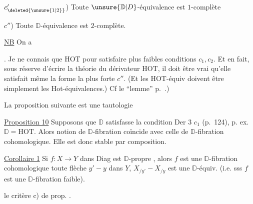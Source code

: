 $c_{\deleted{\unsure{1|2}}}'$) Toute $\unsure{\mathbb D|D}$-équivalence est  $1$-complète

$c''$) Toute $\mathbb D$-équivalence est $2$-complète.

\uline{NB} On a


. Je ne connais que HOT pour satisfaire   plus faibles conditions $c_1,c_2$. Et en fait, sous réserve d'écrire la théorie du dérivateur HOT, il doit être vrai qu'elle satisfait même la forme la plus forte $c''$. (Et les HOT-équiv doivent être simplement les Hot-équivalences.) Cf le ``lemme'' p.~.)

La proposition suivante est une tautologie

\uline{Proposition 10} Supposons que $\mathbb D$ satisfasse la condition Der 3 $c_1$ (p.~124), p. ex. $\mathbb D=\mathrm{HOT}$. Alors  notion de $\mathbb D$-fibration coïncide avec celle de $\mathbb D$-fibration cohomologique. Elle est donc stable par composition. 

\uline{Corollaire 1} Si $f:X\to Y$ dans Diag est $\mathbb D$-propre , alors $f$ est une $\mathbb D$-fibration cohomologique   toute flèche $y'-y$ dans $Y$, $X_{/y'}-X_{/y}$ est une $\mathbb D$-équiv. (i.e. sss $f$ est une $\mathbb D$-fibration  faible).

 le critère c) de prop. .
